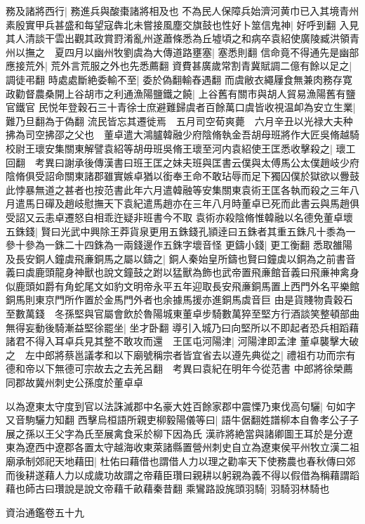 務及諸將西行|{
	務進兵與酸棗諸將相及也}
不為民人保障兵始濟河黄巾已入其境青州素殷實甲兵甚盛和每望寇犇北未嘗接風塵交旗鼓也性好卜筮信鬼神|{
	好呼到翻}
入見其人清談干雲出觀其政賞罸淆亂州遂蕭條悉為丘墟頃之和病卒袁紹使廣陵臧洪領青州以撫之　夏四月以幽州牧劉虞為大傳道路壅塞|{
	塞悉則翻}
信命竟不得通先是幽部應接荒外|{
	荒外言荒服之外也先悉薦翻}
資費甚廣歲常割青冀賦調二億有餘以足之|{
	調徒弔翻}
時處處斷絶委輸不至|{
	委於偽翻輸舂遇翻}
而虞敝衣繩屨食無兼肉務存寛政勸督農桑開上谷胡市之利通漁陽鹽鐵之饒|{
	上谷舊有關市與胡人貿易漁陽舊有鹽官鐵官}
民悦年登穀石三十青徐士庶避難歸虞者百餘萬口虞皆收視温卹為安立生業|{
	難乃旦翻為于偽翻}
流民皆忘其遷徙焉　五月司空荀爽薨　六月辛丑以光禄大夫种拂為司空拂邵之父也　董卓遣大鴻臚韓融少府陰脩執金吾胡母班將作大匠吳脩越騎校尉王瓌安集關東解譬袁紹等胡毋班吳脩王瓌至河内袁紹使王匡悉收擊殺之|{
	瓌工回翻　考異曰謝承後傳漢書曰班王匡之妹夫班與匡書云僕與太傅馬公太僕趙岐少府陰脩俱受詔命關東諸郡雖實嫉卓猶以銜奉王命不敢玷辱而足下獨囚僕於獄欲以釁鼓此悖暴無道之甚者也按范書此年六月遣韓融等安集關東袁術王匡各執而殺之三年八月遣馬日磾及趙岐慰撫天下袁紀遣馬趙亦在三年八月時董卓已死而此書云與馬趙俱受詔又云恚卓遷怒自相乖迕疑非班書今不取}
袁術亦殺陰脩惟韓融以名德免董卓壞五銖錢|{
	賢曰光武中興除王莽貨泉更用五銖錢孔頴逹曰五銖者其重五銖凡十黍為一參十參為一銖二十四銖為一兩錢邊作五銖字壞音怪}
更鑄小錢|{
	更工衡翻}
悉取雒陽及長安銅人鐘虡飛亷銅馬之屬以鑄之|{
	銅人秦始皇所鑄也賢曰鐘虡以銅為之前書音義曰虡鹿頭龍身神獸也說文鐘鼓之跗以猛獸為飾也武帝置飛亷館音義曰飛亷神禽身似鹿頭如爵有角蛇尾文如豹文明帝永平五年迎取長安飛亷銅馬置上西門外名平樂館銅馬則東京門所作置於金馬門外者也余據馬援亦進銅馬虡音巨}
由是貨賤物貴穀石至數萬錢　冬孫堅與官屬會飲於魯陽城東董卓步騎數萬猝至堅方行酒談笑整頓部曲無得妄動後騎漸益堅徐罷坐|{
	坐才卧翻}
導引入城乃曰向堅所以不即起者恐兵相蹈藉諸君不得入耳卓兵見其整不敢攻而還　王匡屯河陽津|{
	河陽津即孟津}
董卓襲擊大破之　左中郎將蔡邕議孝和以下廟號稱宗者皆宜省去以遵先典從之|{
	禮祖冇功而宗有德和帝以下無德可宗故去之去羌呂翻　考異曰袁紀在明年今從范書}
中郎將徐榮薦同郡故冀州刺史公孫度於董卓卓

以為遼東太守度到官以法誅滅郡中名豪大姓百餘家郡中震慄乃東伐高句驪|{
	句如字又音駒驪力知翻}
西擊烏桓語所親吏柳毅陽儀等曰|{
	語牛倨翻姓譜柳本自魯孝公子子展之孫以王父字為氏至展禽食采於柳下因為氏}
漢祚將絶當與諸卿圖王耳於是分遼東為遼西中遼郡各置太守越海收東萊諸縣置營州刺史自立為遼東侯平州牧立漢二祖廟承制郊祀天地藉田|{
	杜佑曰藉借也謂借人力以理之勸率天下使務農也春秋傳曰郊而後耕遂藉人力以成歲功故謂之帝藉臣瓚曰親耕以躬親為義不得以假借為稱藉謂蹈藉也師古曰瓚說是說文帝藉千畝藉秦昔翻}
乘鸞路設旄頭羽騎|{
	羽騎羽林騎也}


資治通鑑卷五十九
